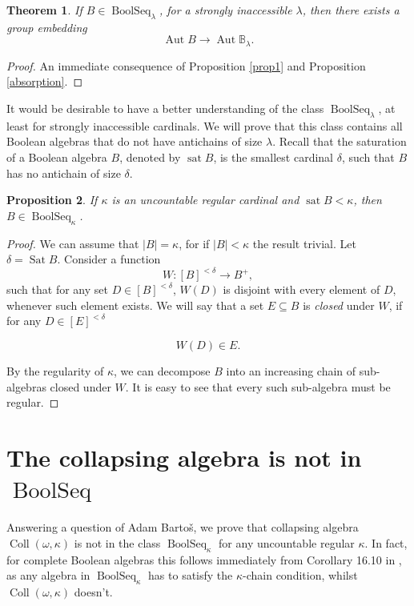 \documentclass[11pt]{amsart}
\newtheorem{thm}{Theorem}[section]
\newtheorem{prop}[thm]{Proposition}
\theoremstyle{definition}
\DeclareMathOperator{\BoolSeq}{BoolSeq}
\newcommand{\aut}{\operatorname{Aut}}
\newcommand{\blim}{\mathbb{B}_\lambda}
\newcommand{\coll}{\operatorname{Coll}(\omega,\kappa)}
\begin{document}
\begin{thm}\label{topuniversality}
	If $B\in \BoolSeq_\lambda$, for a strongly inaccessible $\lambda$, then there exists a group embedding
	$$\aut{B} \longrightarrow \aut{\blim}.$$
\end{thm}

\begin{proof}
	
	An immediate consequence of Proposition \ref{prop1} and Proposition \ref{absorption}.
	
\end{proof}

It would be desirable to have a better understanding of the class $\BoolSeq_\lambda$, at least for strongly inaccessible cardinals. We will prove that this class contains all Boolean algebras that do not have antichains of size $\lambda$.  Recall that the saturation of a Boolean algebra $B$, denoted by $\operatorname{sat}{B}$, is the smallest cardinal $\delta$, such that $B$ has no antichain of size $\delta$.

\begin{prop}
	If $\kappa$ is an uncountable regular cardinal and $\operatorname{sat}{B}<\kappa$, then $B\in \BoolSeq_\kappa$.
\end{prop}
\begin{proof}
	
We can assume that $|B|=\kappa$, for if $|B|<\kappa$ the result trivial. Let $\delta=\operatorname{Sat}{B}$. Consider a function 
$$W:[B]^{< \delta}\longrightarrow B^+,$$
such that for any set $D \in [B]^{< \delta}$, $W(D)$ is disjoint with every element of $D$, whenever such element exists. We will say that a set $E \subseteq B$ is \emph{closed} under $W$, if for any $D \in [E]^{< \delta}$

$$W(D) \in E.$$

By the regularity of $\kappa$, we can decompose $B$ into an increasing chain of sub-algebras closed under $W$. It is easy to see that every such sub-algebra must be regular.
\end{proof}

\section{The collapsing algebra is not in $\BoolSeq$}

Answering a question of Adam Barto\v{s}, we prove that collapsing algebra $\coll$ is not in the class $\BoolSeq_\kappa$ for any uncountable regular $\kappa$. In fact, for complete Boolean algebras this follows immediately from Corollary 16.10 in \cite{jech}, as any algebra in $\BoolSeq_\kappa$ has to satisfy the $\kappa$-chain condition, whilst $\coll$ doesn't.
\end{document}

